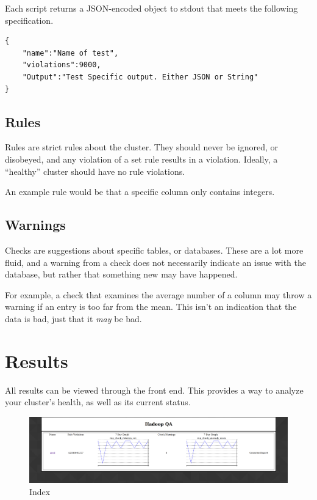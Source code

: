 Each script returns a JSON-encoded object to {\ttfamily stdout} that meets the following specification.

\begin{verbatim}
{
    "name":"Name of test",
    "violations":9000,
    "Output":"Test Specific output. Either JSON or String"
}
\end{verbatim}

    \subsection{Rules}
    Rules are strict rules about the cluster. They should never be ignored, or disobeyed, and any violation of a set rule
    results in a violation. Ideally, a ``healthy'' cluster should have no rule violations.

    An example rule would be that a specific column only contains integers.

    \subsection{Warnings}
    Checks are suggestions about specific tables, or databases. These are a lot more fluid, and a warning from a check does
    not necessarily indicate an issue with the database, but rather that something new may have happened.

    For example, a check that examines the average number of a column may throw a warning if an entry is too far from the
    mean. This isn't an indication that the data is bad, just that it \textit{may} be bad.

\section{Results}
All results can be viewed through the front end. This provides a way to analyze your cluster's health, as well as its
current status.

\begin{figure}[H]
    \centering
    \includegraphics[scale=0.2]{./img/index.png}
    \caption{Index}
\end{figure}

